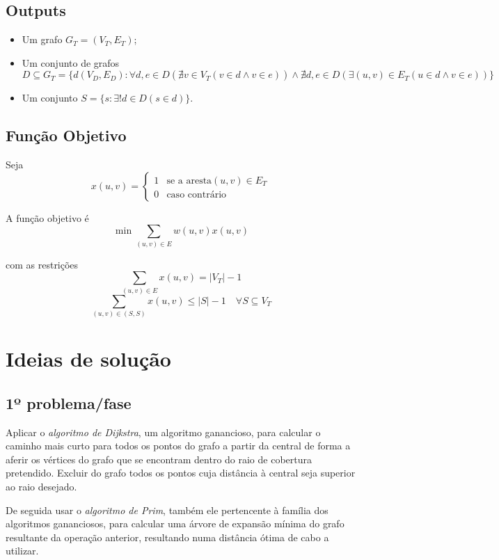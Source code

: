 \documentclass[a4paper,12pt,titlepage]{article}
\begin{document}
\subsection*{Outputs}
\begin{itemize}
\item Um grafo $G_T = ( V_T,E_T )$;
\item Um conjunto de grafos $D \subseteq G_T = \{d(V_D,E_D): \forall d,e \in D(\nexists v \in V_T(v \in d \land v \in e)) \land \nexists d,e\in D(\exists(u,v) \in E_T(u \in d \land v \in e)) \}$
\item Um conjunto $S = \{s : \exists! d \in D(s \in d)\}$.
\end{itemize}

\subsection*{Função Objetivo}
Seja $$x(u,v) = \begin{cases}
1 & \text{se a aresta} (u,v) \in E_T\\
0 & \text{caso contrário} 
\end{cases}$$

A função objetivo é\cite{ieor_mst}
$$\min \sum_{(u,v)\in E} w(u,v)x(u,v)$$

com as restrições 
$$\sum_{(u,v)\in E} x(u,v) = |V_T| - 1$$
$$\sum_{(u,v)\in (S,S)} x(u,v) \leq |S| - 1 \quad \forall S \subseteq V_T$$

\section{Ideias de solução}
\subsection{1º problema/fase}
Aplicar o \emph{algoritmo de Dijkstra}, um algoritmo ganancioso, para calcular o caminho mais curto para todos os pontos do grafo a partir da central de forma a aferir os vértices do grafo que se encontram dentro do raio de cobertura pretendido. Excluir do grafo todos os pontos cuja distância à central seja superior ao raio desejado.

De seguida usar o \emph{algoritmo de Prim}, também ele pertencente à família dos algoritmos gananciosos, para calcular uma árvore de expansão mínima do grafo resultante da operação anterior, resultando numa distância ótima de cabo a utilizar.
\end{document}
